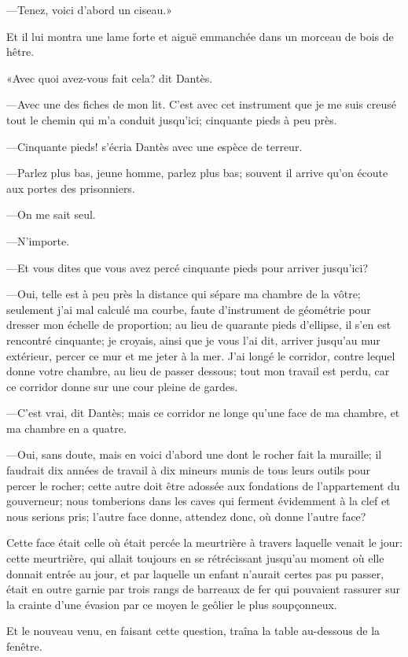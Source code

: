 —Tenez, voici d'abord un ciseau.»

Et il lui montra une lame forte et aiguë emmanchée dans un morceau de bois de hêtre.

«Avec quoi avez-vous fait cela? dit Dantès.

—Avec une des fiches de mon lit. C'est avec cet instrument que je me suis creusé tout le chemin qui m'a conduit jusqu'ici; cinquante pieds à peu près.

—Cinquante pieds! s'écria Dantès avec une espèce de terreur.

—Parlez plus bas, jeune homme, parlez plus bas; souvent il arrive qu'on écoute aux portes des prisonniers.

—On me sait seul.

—N'importe.

—Et vous dites que vous avez percé cinquante pieds pour arriver jusqu'ici?

—Oui, telle est à peu près la distance qui sépare ma chambre de la vôtre; seulement j'ai mal calculé ma courbe, faute d'instrument de géométrie pour dresser mon échelle de proportion; au lieu de quarante pieds d'ellipse, il s'en est rencontré cinquante; je croyais, ainsi que je vous l'ai dit, arriver jusqu'au mur extérieur, percer ce mur et me jeter à la mer. J'ai longé le corridor, contre lequel donne votre chambre, au lieu de passer dessous; tout mon travail est perdu, car ce corridor donne sur une cour pleine de gardes.

—C'est vrai, dit Dantès; mais ce corridor ne longe qu'une face de ma chambre, et ma chambre en a quatre.

—Oui, sans doute, mais en voici d'abord une dont le rocher fait la muraille; il faudrait dix années de travail à dix mineurs munis de tous leurs outils pour percer le rocher; cette autre doit être adossée aux fondations de l'appartement du gouverneur; nous tomberions dans les caves qui ferment évidemment à la clef et nous serions pris; l'autre face donne, attendez donc, où donne l'autre face?

Cette face était celle où était percée la meurtrière à travers laquelle venait le jour: cette meurtrière, qui allait toujours en se rétrécissant jusqu'au moment où elle donnait entrée au jour, et par laquelle un enfant n'aurait certes pas pu passer, était en outre garnie par trois rangs de barreaux de fer qui pouvaient rassurer sur la crainte d'une évasion par ce moyen le geôlier le plus soupçonneux.

Et le nouveau venu, en faisant cette question, traîna la table au-dessous de la fenêtre.

